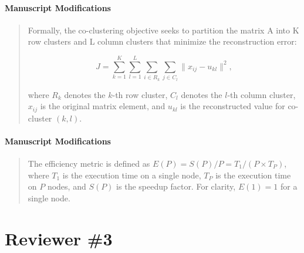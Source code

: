 \documentclass{ar2rc}
\theoremstyle{definition}
\theoremstyle{remark} %
\begin{document}
\paragraph{Manuscript Modifications}

\begin{quote}
  Formally, the co-clustering objective seeks to partition the matrix A into K row clusters and L column clusters that minimize the reconstruction error:

  \begin{equation}
    J = \sum_{k=1}^{K} \sum_{l=1}^{L} \sum_{i \in R_k} \sum_{j \in C_l} \| x_{ij} - u_{kl} \|^2,
  \end{equation}

  where $R_k$ denotes the $k$-th row cluster, $C_l$ denotes the $l$-th column cluster, $x_{ij}$ is the original matrix element, and $u_{kl}$ is the reconstructed value for co-cluster $(k,l)$.
\end{quote}



\paragraph{Manuscript Modifications}

\begin{quote}
  The efficiency metric is defined as $E(P) = S(P)/P = T_1/(P \times T_P)$, where $T_1$ is the execution time on a single node, $T_P$ is the execution time on $P$ nodes, and $S(P)$ is the speedup factor. For clarity, $E(1) = 1$ for a single node.
\end{quote}


\section{Reviewer \#3}

\end{document}

